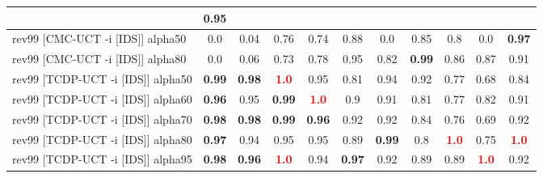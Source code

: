 \documentclass{article}
\begin{document}
\begin{tabular}{|l|r@{$\pm$}rr@{$\pm$}rr@{$\pm$}rr@{$\pm$}rr@{$\pm$}rr@{$\pm$}rr@{$\pm$}rr@{$\pm$}rr@{$\pm$}rr@{$\pm$}r|}
& \multicolumn{2}{c|}{0.95}
\\
\hline
rev99 [CMC-UCT -i [IDS]] alpha50
& \multicolumn{2}{c}{0.0}
& \multicolumn{2}{c}{0.04}
& \multicolumn{2}{c}{0.76}
& \multicolumn{2}{c}{0.74}
& \multicolumn{2}{c}{0.88}
& \multicolumn{2}{c}{0.0}
& \multicolumn{2}{c}{0.85}
& \multicolumn{2}{c}{0.8}
& \multicolumn{2}{c}{0.0}
& \multicolumn{2}{c|}{\textbf{0.97}}
\\
rev99 [CMC-UCT -i [IDS]] alpha80
& \multicolumn{2}{c}{0.0}
& \multicolumn{2}{c}{0.06}
& \multicolumn{2}{c}{0.73}
& \multicolumn{2}{c}{0.78}
& \multicolumn{2}{c}{0.95}
& \multicolumn{2}{c}{0.82}
& \multicolumn{2}{c}{\textbf{0.99}}
& \multicolumn{2}{c}{0.86}
& \multicolumn{2}{c}{0.87}
& \multicolumn{2}{c|}{0.91}
\\
rev99 [TCDP-UCT -i [IDS]] alpha50
& \multicolumn{2}{c}{\textbf{0.99}}
& \multicolumn{2}{c}{\textbf{0.98}}
& \multicolumn{2}{c}{\textbf{\textcolor{red}{1.0}}}
& \multicolumn{2}{c}{0.95}
& \multicolumn{2}{c}{0.81}
& \multicolumn{2}{c}{0.94}
& \multicolumn{2}{c}{0.92}
& \multicolumn{2}{c}{0.77}
& \multicolumn{2}{c}{0.68}
& \multicolumn{2}{c|}{0.84}
\\
rev99 [TCDP-UCT -i [IDS]] alpha60
& \multicolumn{2}{c}{\textbf{0.96}}
& \multicolumn{2}{c}{0.95}
& \multicolumn{2}{c}{\textbf{0.99}}
& \multicolumn{2}{c}{\textbf{\textcolor{red}{1.0}}}
& \multicolumn{2}{c}{0.9}
& \multicolumn{2}{c}{0.91}
& \multicolumn{2}{c}{0.81}
& \multicolumn{2}{c}{0.77}
& \multicolumn{2}{c}{0.82}
& \multicolumn{2}{c|}{0.91}
\\
rev99 [TCDP-UCT -i [IDS]] alpha70
& \multicolumn{2}{c}{\textbf{0.98}}
& \multicolumn{2}{c}{\textbf{0.98}}
& \multicolumn{2}{c}{\textbf{0.99}}
& \multicolumn{2}{c}{\textbf{0.96}}
& \multicolumn{2}{c}{0.92}
& \multicolumn{2}{c}{0.92}
& \multicolumn{2}{c}{0.84}
& \multicolumn{2}{c}{0.76}
& \multicolumn{2}{c}{0.69}
& \multicolumn{2}{c|}{0.92}
\\
rev99 [TCDP-UCT -i [IDS]] alpha80
& \multicolumn{2}{c}{\textbf{0.97}}
& \multicolumn{2}{c}{0.94}
& \multicolumn{2}{c}{0.95}
& \multicolumn{2}{c}{0.95}
& \multicolumn{2}{c}{0.89}
& \multicolumn{2}{c}{\textbf{0.99}}
& \multicolumn{2}{c}{0.8}
& \multicolumn{2}{c}{\textbf{\textcolor{red}{1.0}}}
& \multicolumn{2}{c}{0.75}
& \multicolumn{2}{c|}{\textbf{\textcolor{red}{1.0}}}
\\
rev99 [TCDP-UCT -i [IDS]] alpha95
& \multicolumn{2}{c}{\textbf{0.98}}
& \multicolumn{2}{c}{\textbf{0.96}}
& \multicolumn{2}{c}{\textbf{\textcolor{red}{1.0}}}
& \multicolumn{2}{c}{0.94}
& \multicolumn{2}{c}{\textbf{0.97}}
& \multicolumn{2}{c}{0.92}
& \multicolumn{2}{c}{0.89}
& \multicolumn{2}{c}{0.89}
& \multicolumn{2}{c}{\textbf{\textcolor{red}{1.0}}}
& \multicolumn{2}{c|}{0.92}
\\
\hline
\end{tabular}%
\end{document}
